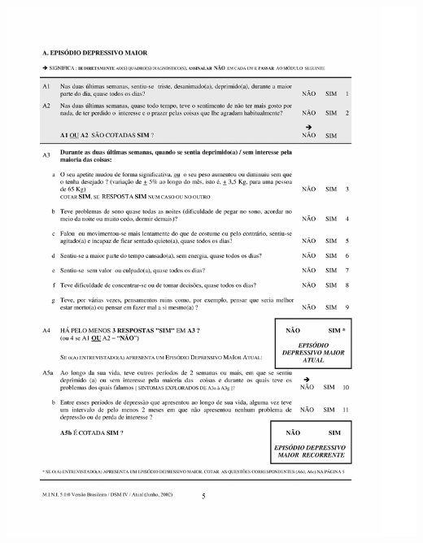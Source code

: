 \documentclass[chapter=TITLE,
               oneside,
               12pt,
               a4paper,
               english,
               brazil]{abntex2}    %
\begin{document}
\begin{anexosenv}
        \begin{center}
        \includegraphics[width=1\textwidth]{img/modulominidepressao.pdf}
        \end{center}


\end{anexosenv}
\end{document}
